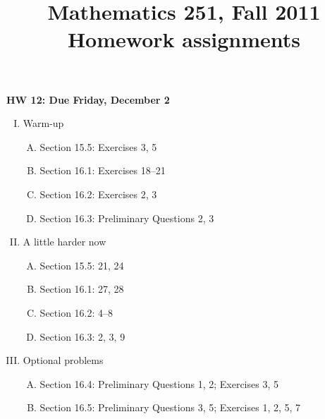 \documentclass[10pt]{amsart}
\title{Mathematics 251, Fall 2011 \\ Homework assignments}
\begin{document}
\maketitle
\thispagestyle{empty}

\begin{center}
\textbf{HW 12: Due Friday, December 2}
\end{center}
\begin{enumerate}[I.]
    \item Warm-up
    \begin{enumerate}[A.]
        \item Section 15.5: Exercises 3, 5
        \item Section 16.1: Exercises 18--21
        \item Section 16.2: Exercises 2, 3
        \item Section 16.3: Preliminary Questions 2, 3
    \end{enumerate}
    \item A little harder now
    \begin{enumerate}[A.]
        \item Section 15.5: 21, 24
        \item Section 16.1: 27, 28
        \item Section 16.2: 4--8
        \item Section 16.3: 2, 3, 9
    \end{enumerate}
    \item Optional problems
    \begin{enumerate}[A.]
        \item Section 16.4: Preliminary Questions 1, 2; Exercises 3, 5
        \item Section 16.5: Preliminary Questions 3, 5; Exercises 1, 2, 5, 7
    \end{enumerate}
\end{enumerate}
\end{document}
